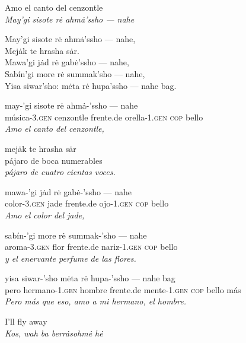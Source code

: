 \documentclass{article}[10pt]
\begin{document}
\begin{center}
Amo el canto del cenzontle\\
\emph{May'gi sisote r\.{e} ahm\.{a}'ssho --- nahe}\\
\end{center}

\noindent
May'gi sisote r\.{e} ahm\.{a}'ssho --- nahe,\\
Mej\.{a}k te hrasha s\.{a}r.\\
Mawa'gi j\.{a}d r\.{e} gab\.{e}'ssho --- nahe,\\
Sab\'{i}n'gi more r\.{e} summak'sho --- nahe,\\
Yisa siwar'sho: m\.{e}ta r\.{e} hupa'ssho --- nahe bag.\\

\begin{exe}
\ex
\gll may-'gi sisote r\.{e} ahm\.{a}-'ssho --- nahe\\
m\'{u}sica-\textsc{3.gen} cenzontle frente.de orella-\textsc{1.gen} \textsc{cop} bello\\
\trans \emph{Amo el canto del cenzontle,}

\ex
\gll mej\.{a}k te hrasha s\.{a}r\\
pájaro de boca numerables\\
\trans \emph{pájaro de cuatro cientas voces.}

\ex
\gll mawa-'gi j\.{a}d r\.{e} gab\.{e}-'ssho --- nahe\\
color-\textsc{3.gen} jade frente.de ojo-\textsc{1.gen} \textsc{cop} bello\\
\trans \emph{Amo el color del jade,}

\ex
\gll sab\'{i}n-'gi more r\.{e} summak-'sho --- nahe\\
aroma-\textsc{3.gen} flor frente.de nariz-\textsc{1.gen} \textsc{cop} bello\\
\trans \emph{y el enervante perfume de las flores.}

\ex
\gll yisa siwar-'sho m\.{e}ta r\.{e} hupa-'ssho --- nahe bag\\
pero hermano-\textsc{1.gen} hombre frente.de mente-\textsc{1.gen} \textsc{cop} bello m\'{a}s\\
\trans \emph{Pero más que eso, amo a mi hermano, el hombre.}
\end{exe}
\clearpage

\begin{center}
I'll fly away\\
\emph{Kos, wah ba berr\.{a}sohm\.{e} h\.{e}}\\
\end{center}
\end{document}

